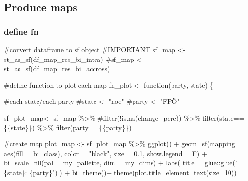 \documentclass[
  letterpaper,
  DIV=11,
  numbers=noendperiod,
  oneside]{scrartcl}
\newenvironment{Shaded}{\begin{snugshade}}{\end{snugshade}}
\newcommand{\AttributeTok}[1]{\textcolor[rgb]{0.40,0.45,0.13}{#1}}
\newcommand{\CommentTok}[1]{\textcolor[rgb]{0.37,0.37,0.37}{#1}}
\newcommand{\ControlFlowTok}[1]{\textcolor[rgb]{0.00,0.23,0.31}{#1}}
\newcommand{\DecValTok}[1]{\textcolor[rgb]{0.68,0.00,0.00}{#1}}
\newcommand{\FloatTok}[1]{\textcolor[rgb]{0.68,0.00,0.00}{#1}}
\newcommand{\FunctionTok}[1]{\textcolor[rgb]{0.28,0.35,0.67}{#1}}
\newcommand{\NormalTok}[1]{\textcolor[rgb]{0.00,0.23,0.31}{#1}}
\newcommand{\OtherTok}[1]{\textcolor[rgb]{0.00,0.23,0.31}{#1}}
\newcommand{\SpecialCharTok}[1]{\textcolor[rgb]{0.37,0.37,0.37}{#1}}
\newcommand{\StringTok}[1]{\textcolor[rgb]{0.13,0.47,0.30}{#1}}
\begin{document}
\hypertarget{produce-maps}{%
\subsection{Produce maps}\label{produce-maps}}

\hypertarget{define-fn}{%
\subsubsection{define fn}\label{define-fn}}

\begin{Shaded}
\begin{Highlighting}[]
\CommentTok{\#convert dataframe to sf object}
\CommentTok{\#IMPORTANT}
\NormalTok{sf\_map }\OtherTok{\textless{}{-}} \FunctionTok{st\_as\_sf}\NormalTok{(df\_map\_res\_bi\_intra)}
\CommentTok{\#sf\_map \textless{}{-} st\_as\_sf(df\_map\_res\_bi\_accross)}

\CommentTok{\#define function to plot each map}
\NormalTok{fn\_plot }\OtherTok{\textless{}{-}} \ControlFlowTok{function}\NormalTok{(party, state) \{}
  
\CommentTok{\#each state/each party  }
\CommentTok{\#state \textless{}{-} "noe"}
\CommentTok{\#party \textless{}{-} "FPÖ"}

\NormalTok{sf\_plot\_map}\OtherTok{\textless{}{-}}\NormalTok{ sf\_map }\SpecialCharTok{\%\textgreater{}\%} 
  \CommentTok{\#filter(!is.na(change\_perc)) \%\textgreater{}\% }
  \FunctionTok{filter}\NormalTok{(state}\SpecialCharTok{==}\NormalTok{\{\{state\}\}) }\SpecialCharTok{\%\textgreater{}\%} 
  \FunctionTok{filter}\NormalTok{(party}\SpecialCharTok{==}\NormalTok{\{\{party\}\}) }

\CommentTok{\#create map}
\NormalTok{plot\_map }\OtherTok{\textless{}{-}}\NormalTok{ sf\_plot\_map }\SpecialCharTok{\%\textgreater{}\%} 
  \FunctionTok{ggplot}\NormalTok{() }\SpecialCharTok{+}
  \FunctionTok{geom\_sf}\NormalTok{(}\AttributeTok{mapping =} \FunctionTok{aes}\NormalTok{(}\AttributeTok{fill =}\NormalTok{ bi\_class),}
          \AttributeTok{color =} \StringTok{"black"}\NormalTok{, }
          \AttributeTok{size =} \FloatTok{0.1}\NormalTok{, }
          \AttributeTok{show.legend =}\NormalTok{ F) }\SpecialCharTok{+}
 \FunctionTok{bi\_scale\_fill}\NormalTok{(}\AttributeTok{pal =}\NormalTok{ my\_pallette, }
               \AttributeTok{dim =}\NormalTok{ my\_dims) }\SpecialCharTok{+}
  \FunctionTok{labs}\NormalTok{(}
    \AttributeTok{title =}\NormalTok{ glue}\SpecialCharTok{::}\FunctionTok{glue}\NormalTok{(}\StringTok{"\{state\}: \{party\}"}\NormalTok{)}
\NormalTok{  ) }\SpecialCharTok{+}
  \FunctionTok{bi\_theme}\NormalTok{()}\SpecialCharTok{+}
    \FunctionTok{theme}\NormalTok{(}\AttributeTok{plot.title=}\FunctionTok{element\_text}\NormalTok{(}\AttributeTok{size=}\DecValTok{10}\NormalTok{))}


\end{Highlighting}
\end{Shaded}
\end{document}
